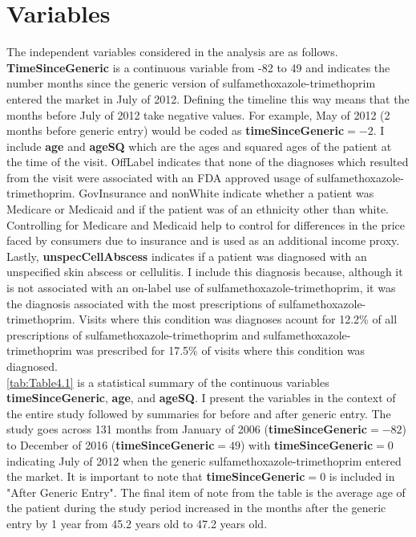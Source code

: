 \section{Variables}
The independent variables considered in the analysis are as follows. \textbf{TimeSinceGeneric} is a continuous variable from -82 to 49 and indicates the number months since the generic version of sulfamethoxazole-trimethoprim entered the market in July of 2012. Defining the timeline this way means that the months before July of 2012 take negative values. For example, May of 2012 (2 months before generic entry) would be coded as \textbf{timeSinceGeneric}$=-2$. I include \textbf{age} and \textbf{ageSQ} which are the ages and squared ages of the patient at the time of the visit. OffLabel indicates that none of the diagnoses which resulted from the visit were associated with an FDA approved usage of sulfamethoxazole-trimethoprim. GovInsurance and nonWhite indicate whether a patient was Medicare or Medicaid and if the patient was of an ethnicity other than white. Controlling for Medicare and Medicaid help to control for differences in the price faced by consumers due to insurance and is used as an additional income proxy. Lastly, \textbf{unspecCellAbscess} indicates if a patient was diagnosed with an unspecified skin abscess or cellulitis. I include this diagnosis because, although it is not associated with an on-label use of sulfamethoxazole-trimethoprim, it was the diagnosis associated with the most prescriptions of sulfamethoxazole-trimethoprim. Visits where this condition was diagnoses acount for 12.2\% of all prescriptions of sulfamethoxazole-trimethoprim and sulfamethoxazole-trimethoprim was prescribed for 17.5\% of visits where this condition was diagnosed.\\
\indent \autoref{tab:Table4.1} is a statistical summary of the continuous variables \textbf{timeSinceGeneric}, \textbf{age}, and \textbf{ageSQ}. I present the variables in the context of the entire study followed by summaries for before and after generic entry. The study goes across 131 months from January of 2006 (\textbf{timeSinceGeneric}$=-82$) to December of 2016 (\textbf{timeSinceGeneric}$=49$) with \textbf{timeSinceGeneric}$=0$ indicating July of 2012 when the generic sulfamethoxazole-trimethoprim entered the market. It is important to note that \textbf{timeSinceGeneric}$=0$ is included in "After Generic Entry". The final item of note from the table is the average age of the patient during the study period increased in the months after the generic entry by 1 year from 45.2 years old to 47.2 years old.\\

